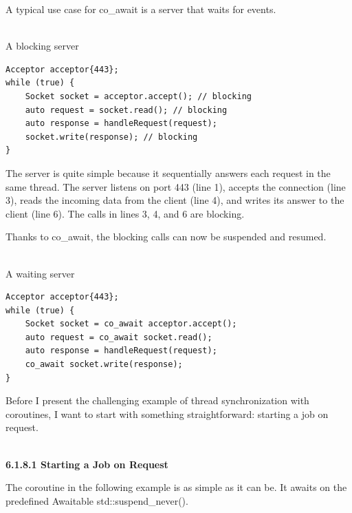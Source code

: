 A typical use case for co\_await is a server that waits for events.

\hspace*{\fill} \\ %
\noindent
A blocking server
\begin{lstlisting}[style=styleCXX]
Acceptor acceptor{443};
while (true) {
	Socket socket = acceptor.accept(); // blocking
	auto request = socket.read(); // blocking
	auto response = handleRequest(request);
	socket.write(response); // blocking
}
\end{lstlisting}

The server is quite simple because it sequentially answers each request in the same thread. The server listens on port 443 (line 1), accepts the connection (line 3), reads the incoming data from the client (line 4), and writes its answer to the client (line 6). The calls in lines 3, 4, and 6 are blocking.

Thanks to co\_await, the blocking calls can now be suspended and resumed.

\hspace*{\fill} \\ %
\noindent
A waiting server
\begin{lstlisting}[style=styleCXX]
Acceptor acceptor{443};
while (true) {
	Socket socket = co_await acceptor.accept();
	auto request = co_await socket.read();
	auto response = handleRequest(request);
	co_await socket.write(response);
}
\end{lstlisting}

Before I present the challenging example of thread synchronization with coroutines, I want to start with something straightforward: starting a job on request.

\hspace*{\fill} \\ %
\noindent
\textbf{6.1.8.1\hspace{0.2cm} Starting a Job on Request}

The coroutine in the following example is as simple as it can be. It awaits on the predefined Awaitable std::suspend\_never().

